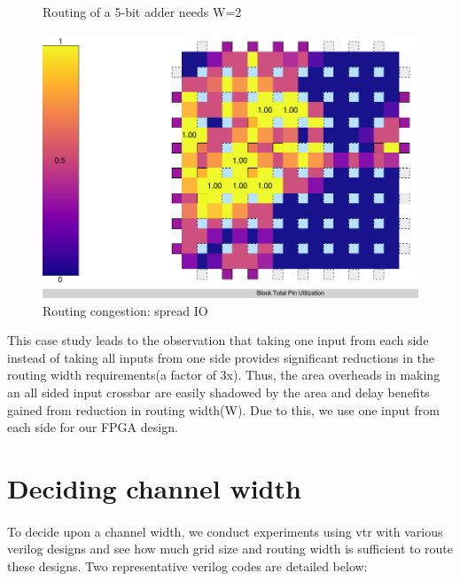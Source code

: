 \begin{itemize}
\begin{figure}[H]
\caption{Routing of a 5-bit adder needs W=2}
\label{fig:Figure}
\end{figure}
\begin{figure}[H]
\centering
\includegraphics[scale=0.32]{BTP_work/5-bit_adder_on_spread_IO_clb/routing_congestion.png}
\caption{Routing congestion: spread IO}
\label{fig:Figure}
\end{figure}

\end{itemize}
This case study leads to the observation that taking one input from each side instead of taking all inputs from one side provides significant reductions in the routing width requirements(a factor of 3x). Thus, the area overheads in making an all sided input crossbar are easily shadowed by the area and delay benefits gained from reduction in routing width(W). Due to this, we use one input from each side for our FPGA design. 

\section{Deciding channel width}
\paragraph{}
To decide upon a channel width, we conduct experiments using vtr with various verilog designs and see how much grid size and routing width is sufficient to route these designs. Two representative verilog codes are detailed below:


